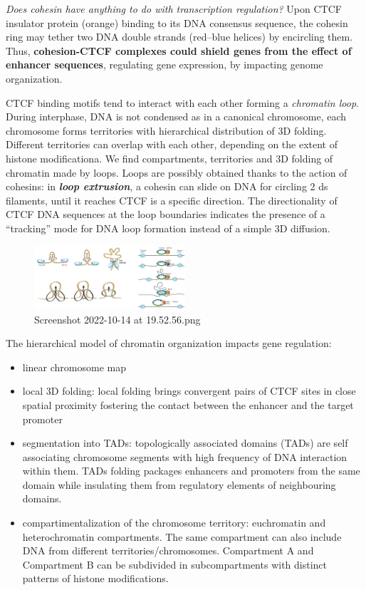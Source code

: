 \emph{Does cohesin have anything to do with transcription regulation?}
Upon CTCF insulator protein (orange) binding to its DNA consensus sequence, the cohesin ring may tether two DNA double strands (red--blue helices) by encircling them. Thus, \textbf{cohesion-CTCF complexes could shield genes from the effect of enhancer sequences}, regulating gene expression, by impacting genome organization.

CTCF binding motifs tend to interact with each other forming a \emph{chromatin loop}. During interphase, DNA is not condensed as in a canonical chromosome, each chromosome forms territories with hierarchical distribution of 3D folding. Different territories can overlap with each other, depending on the extent of histone modificationa. We find compartments, territories and 3D folding of chromatin made by loops. Loops are possibly obtained thanks to the action of cohesins: in \textbf{\emph{loop extrusion}}, a cohesin can slide on DNA for circling 2 ds filaments, until it reaches CTCF is a specific direction. The directionality of CTCF DNA sequences at the loop boundaries indicates the presence of a ``tracking'' mode for DNA loop formation instead of a simple 3D diffusion.

\begin{figure}
\centering
\includegraphics[width=0.5\textwidth]{../_resources/Screenshot_2022-10-14_at_19-52-56.png}
\caption{Screenshot 2022-10-14 at 19.52.56.png}
\end{figure}

The hierarchical model of chromatin organization impacts gene regulation:

\begin{itemize}
\tightlist
\item
  linear chromosome map
\item
  local 3D folding: local folding brings convergent pairs of CTCF sites in close spatial proximity fostering the contact between the enhancer and the target promoter
\item
  segmentation into TADs: topologically associated domains (TADs) are self associating chromosome segments with high frequency of DNA interaction within them. TADs folding packages enhancers and promoters from the same domain while insulating them from regulatory elements of neighbouring domains.
\item
  compartimentalization of the chromosome territory: euchromatin and heterochromatin compartments. The same compartment can also include DNA from different territories/chromosomes. Compartment A and Compartment B can be subdivided in subcompartments with distinct patterns of histone modifications.
\end{itemize}

